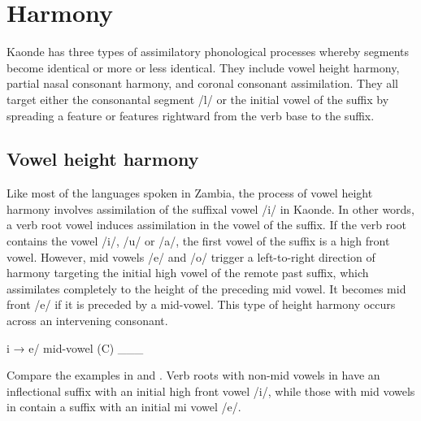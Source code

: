 \documentclass[output=paper]{langsci/langscibook}
\begin{document}
\section{Harmony} \label{§2:harmony.kawasha}

Kaonde has three types of assimilatory phonological processes whereby segments become identical or more or less identical. They include vowel height harmony, partial nasal consonant harmony, and coronal consonant assimilation. They all target either the consonantal segment /l/ or the initial vowel of the suffix by spreading a feature or features rightward from the verb base to the suffix.

\subsection{Vowel height harmony}

Like most of the languages spoken in Zambia, the process of vowel height harmony involves assimilation of the suffixal vowel /i/ in Kaonde. In other words, a verb root vowel induces assimilation in the vowel of the suffix. If the verb root contains the vowel /i/, /u/ or /a/, the first vowel of the suffix is a high front vowel. However, mid vowels /e/ and /o/ trigger a left-to-right direction of harmony targeting the initial high vowel of the remote past suffix, which assimilates completely to the height of the preceding mid vowel. It becomes mid front /e/ if it is preceded by a mid-vowel. This type of height harmony occurs across an intervening consonant.

\ea
\label{ex:2.kawasha}
i → e/ mid-vowel (C) \_\_\_

\z

Compare the examples in  and . Verb roots with non-mid vowels in  have an inflectional suffix with an initial high front vowel /i/, while those with mid vowels in  contain a suffix with an initial mi vowel /e/. 
\end{document}
